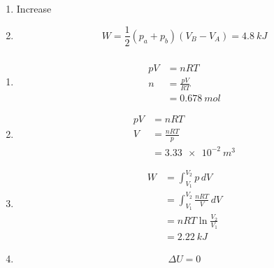 \documentclass{article}
\begin{document}
\setcounter{subsubsection}{34}
\subsubsection{}

\begin{enumerate}
  \item Increase

  \item \[W = \frac{1}{2} (p_a + p_b) (V_B - V_A) = \qty{4.8}{kJ}\]
\end{enumerate}

\setcounter{subsubsection}{36}
\subsubsection{}

\begin{enumerate}
  \item

        \begin{align*}
          p V & = n R T            \\
          n   & = \frac{p V}{R T}  \\
              & = \qty{0.678}{mol}
        \end{align*}

  \item

        \begin{align*}
          p V & = n R T              \\
          V   & = \frac{n R T}{p}    \\
              & = \qty{3.33e-2}{m^3}
        \end{align*}

  \item

        \begin{align*}
          W & = \int_{V_1}^{V_2} p \,d V               \\
            & = \int_{V_1}^{V_2} \frac{n R T}{V} \,d V \\
            & = n R T \ln \frac{V_2}{V_1}              \\
            & = \qty{2.22}{kJ}
        \end{align*}

  \item \[\Delta U = 0\]
\end{enumerate}

\setcounter{subsubsection}{38}
\subsubsection{}
\end{document}
